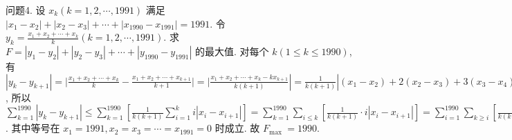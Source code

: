 问题4. 设 $x_k(k=1,2, \cdots, 1991)$ 满足 $\left|x_1-x_2\right|+\left|x_2-x_3\right|+\cdots+\mid x_{1990}- x_{1991} \mid=1991$. 令 $y_k=\frac{x_1+x_2+\cdots+x_k}{k}(k=1,2, \cdots, 1991)$. 求 $F= \left|y_1-y_2\right|+\left|y_2-y_3\right|+\cdots+\left|y_{1990}-y_{1991}\right|$ 的最大值.
对每个 $k(1 \leqslant k \leqslant 1990)$, 有 $\left|y_k-y_{k+1}\right|=\mid \frac{x_1+x_2+\cdots+x_k}{k}- \frac{x_1+x_2+\cdots+x_{k+1}}{k+1}|=| \frac{x_1+x_2+\cdots+x_k-k x_{k+1}}{k(k+1)}\left|=\frac{1}{k(k+1)}\right|\left(x_1-\right. \left.x_2\right)+2\left(x_2-x_3\right)+3\left(x_3-x_4\right)+\cdots+k\left(x_k-x_{k+1}\right)\left|\leqslant \frac{1}{k(k+1)}\right|\left(x_1-x_2\right) \mid+ \left|2\left(x_2-x_3\right)\right|+\left|3\left(x_3-x_4\right)\right|+\cdots+\left|k\left(x_k-x_{k+1}\right)\right|=\frac{1}{k(k+1)} \sum_{i=1}^k i\left|x_i-x_{i+1}\right|$, 所以 $\sum_{k=1}^{1990}\left|y_k-y_{k+1}\right| \leqslant \sum_{k=1}^{1990}\left[\frac{1}{k(k+1)} \sum_{i=1}^k i\left|x_i-x_{i+1}\right|\right]= \sum_{k=1}^{1990} \sum_{i \leqslant k}\left[\frac{1}{k(k+1)} \cdot i\left|x_i-x_{i+1}\right|\right]=\sum_{i=1}^{1990} \sum_{k \geqslant i}\left[\frac{1}{k(k+1)} \cdot i\left|x_i-x_{i+1}\right|\right]= \sum_{i=1}^{1990}\left(i\left|x_i-x_{i+1}\right|\right) \sum_{k=i}^{1990} \frac{1}{k(k+1)}=\sum_{i=1}^{1990}\left(i\left|x_i-x_{i+1}\right|\right) \sum_{k=i}^{1990}\left(\frac{1}{k}-\frac{1}{k+1}\right)= \sum_{i=1}^{1990}\left(i\left|x_i-x_{i+1}\right|\right)\left(\frac{1}{i}-\frac{1}{1991}\right)=\sum_{i=1}^{1990}\left(\left|x_i-x_{i+1}\right|\right)\left(1-\frac{i}{1991}\right) \leqslant \sum_{i=1}^{1990}\left(\left|x_i-x_{i+1}\right|\right)\left(1-\frac{1}{1991}\right)=1991\left(1-\frac{1}{1991}\right)=1990$. 其中等号在 $x_1= 1991, x_2=x_3=\cdots=x_{1991}=0$ 时成立.
故 $F_{\text {max }}=1990$.



